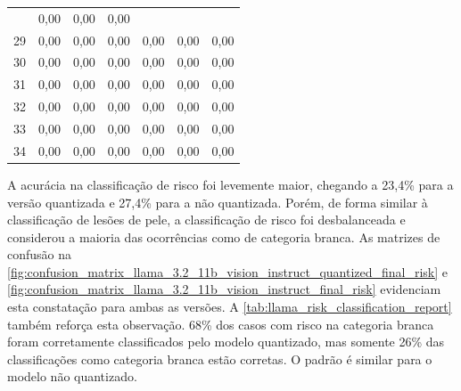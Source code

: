 \begin{table}[ht]
\begin{tabular}{l|c|c|c|c|c|c}
              & 0,00                                   & 0,00                                      & 0,00
        \\
        29    & 0,00                                   & 0,00                                      & 0,00
              & 0,00                                   & 0,00                                      & 0,00
        \\
        30    & 0,00                                   & 0,00                                      & 0,00
              & 0,00                                   & 0,00                                      & 0,00
        \\
        31    & 0,00                                   & 0,00                                      & 0,00
              & 0,00                                   & 0,00                                      & 0,00
        \\
        32    & 0,00                                   & 0,00                                      & 0,00
              & 0,00                                   & 0,00                                      & 0,00
        \\
        33    & 0,00                                   & 0,00                                      & 0,00
              & 0,00                                   & 0,00                                      & 0,00
        \\
        34    & 0,00                                   & 0,00                                      & 0,00
              & 0,00                                   & 0,00                                      & 0,00
        \\ \hline
    \end{tabular}
    \label{tab:llama_skin_lesion_classification_report}
\end{table}

A acurácia na classificação de risco foi levemente maior, chegando a 23,4\% para a versão quantizada e 27,4\% para a
não quantizada. Porém, de forma similar à classificação de lesões de pele, a classificação de risco foi desbalanceada e
considerou a maioria das ocorrências como de categoria branca. As matrizes de confusão na
\autoref{fig:confusion_matrix_llama_3.2_11b_vision_instruct_quantized_final_risk} e
\autoref{fig:confusion_matrix_llama_3.2_11b_vision_instruct_final_risk} evidenciam esta constatação para ambas as
versões. A \autoref{tab:llama_risk_classification_report} também reforça esta observação. 68\% dos casos com risco na
categoria branca foram corretamente classificados pelo modelo quantizado, mas somente 26\% das classificações como
categoria branca estão corretas. O padrão é similar para o modelo não quantizado.

